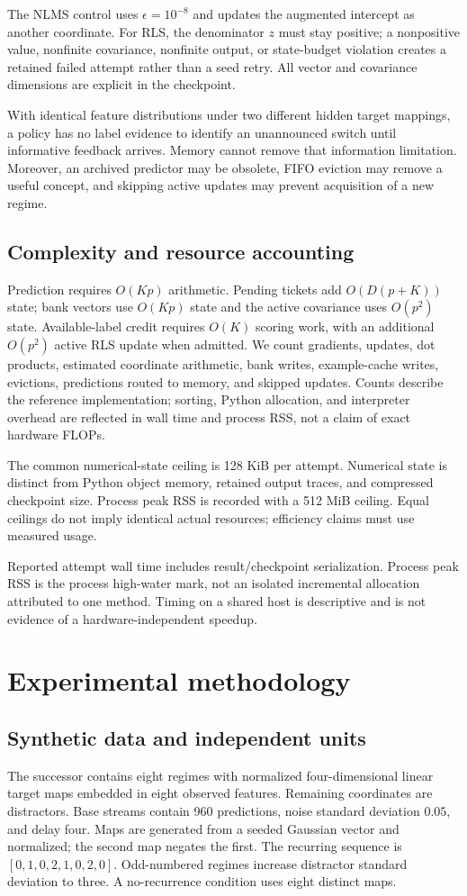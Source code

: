 \documentclass[10pt]{article}
\begin{document}
The NLMS control uses $\epsilon=10^{-8}$ and updates the augmented intercept as another coordinate. For RLS, the denominator $z$ must stay positive; a nonpositive value, nonfinite covariance, nonfinite output, or state-budget violation creates a retained failed attempt rather than a seed retry. All vector and covariance dimensions are explicit in the checkpoint.

With identical feature distributions under two different hidden target mappings, a policy has no label evidence to identify an unannounced switch until informative feedback arrives. Memory cannot remove that information limitation. Moreover, an archived predictor may be obsolete, FIFO eviction may remove a useful concept, and skipping active updates may prevent acquisition of a new regime.

\subsection{Complexity and resource accounting}
Prediction requires $O(Kp)$ arithmetic. Pending tickets add $O(D(p+K))$ state; bank vectors use $O(Kp)$ state and the active covariance uses $O(p^2)$ state. Available-label credit requires $O(K)$ scoring work, with an additional $O(p^2)$ active RLS update when admitted. We count gradients, updates, dot products, estimated coordinate arithmetic, bank writes, example-cache writes, evictions, predictions routed to memory, and skipped updates. Counts describe the reference implementation; sorting, Python allocation, and interpreter overhead are reflected in wall time and process RSS, not a claim of exact hardware FLOPs.

The common numerical-state ceiling is 128 KiB per attempt. Numerical state is distinct from Python object memory, retained output traces, and compressed checkpoint size. Process peak RSS is recorded with a 512 MiB ceiling. Equal ceilings do not imply identical actual resources; efficiency claims must use measured usage.

Reported attempt wall time includes result/checkpoint serialization. Process peak RSS is the process high-water mark, not an isolated incremental allocation attributed to one method. Timing on a shared host is descriptive and is not evidence of a hardware-independent speedup.

\section{Experimental methodology}
\subsection{Synthetic data and independent units}
The successor contains eight regimes with normalized four-dimensional linear target maps embedded in eight observed features. Remaining coordinates are distractors. Base streams contain 960 predictions, noise standard deviation $0.05$, and delay four. Maps are generated from a seeded Gaussian vector and normalized; the second map negates the first. The recurring sequence is $[0,1,0,2,1,0,2,0]$. Odd-numbered regimes increase distractor standard deviation to three. A no-recurrence condition uses eight distinct maps.
\end{document}
